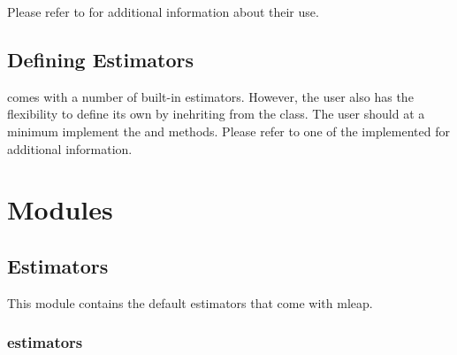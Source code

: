 \documentclass[letterpaper,10pt,english]{sphinxmanual}
\begin{document}
Please refer to {\hyperref[\detokenize{analyze_results:analyze-results}]{}} for additional information about their use.


\section{Defining Estimators}
\label{\detokenize{tutorial:defining-estimators}}
 comes with a number of built-in estimators. However, the user also has the flexibility to define its own by inehriting from the {\hyperref[\detokenize{estimators:mleap-estimator-label}]{}} class. The user should at a minimum implement the  and  methods. Please refer to one of the implemented {\hyperref[\detokenize{estimators:estimators}]{}} for additional information.


\chapter{Modules}
\label{\detokenize{modules:modules}}\label{\detokenize{modules::doc}}

\section{Estimators}
\label{\detokenize{estimators:estimators}}\label{\detokenize{estimators::doc}}\label{\detokenize{estimators:id1}}
This module contains the default estimators that come with mleap.


\subsection{estimators}
\label{\detokenize{estimators:id2}}\label{\detokenize{estimators:module-mleap.estimators.estimators}}
\end{document}
